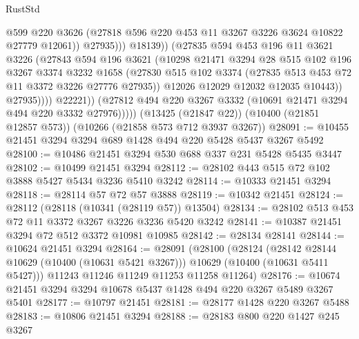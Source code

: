\begin{lexlean}{RustStd}
\begin{coremodule}
{\begin{coremodule}
{{{{{{{{{{{{{{{{{{{{{{{{{                                @599
                                @220
                                @3626
                                (@27818 @596 @220 @453 @11 @3267 @3226 @3624 @10822 @27779 @12061))
                              @27935)))
                        @18139))
                    (@27835
                      @594
                      @453
                      @196
                      @11
                      @3621
                      @3226
                      (@27843
                        @594
                        @196
                        @3621
                        (@10298
                          @21471
                          @3294
                          @28
                          @515
                          @102
                          @196
                          @3267
                          @3374
                          @3232
                          @1658
                          (@27830
                            @515
                            @102
                            @3374
                            (@27835 @513 @453 @72 @11 @3372 @3226 @27776 @27935))
                          @12026
                          @12029
                          @12032
                          @12035
                          @10443))
                      @27935))))
              @22221))
          (@27812 @494 @220 @3267 @3332 (@10691 @21471 @3294 @494 @220 @3332 @27976)))))
    (@13425 (@21847 @22))
    (@10400 (@21851 @12857 @573))
    (@10266 (@21858 @573 @712 @3937 @3267))
@28091 := @10455 @21451 @3294 @3294 @689 @1428 @494 @220 @5428 @5437 @3267 @5492
@28100 := @10486 @21451 @3294 @530 @688 @337 @231 @5428 @5435 @3447
@28102 := @10499 @21451 @3294
@28112 := @28102 @443 @515 @72 @102 @3888 @5427 @5434 @3236 @5410 @3242
@28114 := @10333 @21451 @3294
@28118 := @28114 @57 @72 @57 @3888
@28119 := @10342 @21451
@28124 := @28112 (@28118 (@10341 (@28119 @57)) @13504)
@28134 := @28102 @513 @453 @72 @11 @3372 @3267 @3226 @3236 @5420 @3242
@28141 := @10387 @21451 @3294 @72 @512 @3372 @10981 @10985
@28142 := @28134 @28141
@28144 := @10624 @21451 @3294
@28164 := @28091
    (@28100
      (@28124
        (@28142 @28144 @10629 (@10400 (@10631 @5421 @3267)))
        @10629
        (@10400 (@10631 @5411 @5427)))
      @11243
      @11246
      @11249
      @11253
      @11258
      @11264)
@28176 := @10674 @21451 @3294 @3294 @10678 @5437 @1428 @494 @220 @3267 @5489 @3267 @5401
@28177 := @10797 @21451
@28181 := @28177 @1428 @220 @3267 @5488
@28183 := @10806 @21451 @3294
@28188 := @28183 @800 @220 @1427 @245 @3267
}}}}}}}}}}}}}}}}}}}}}}}}}
\end{coremodule}}
\end{coremodule}
\end{lexlean}
